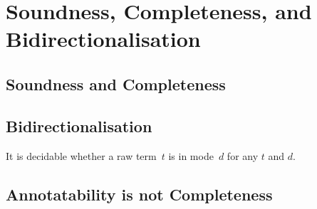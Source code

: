 
\section{Soundness, Completeness, and Bidirectionalisation} \label{sec:annotatability}

\subsection{Soundness and Completeness}
\begin{theorem}[Soundness]\label{thm:term-soundness}
    
\end{theorem}

\begin{theorem}[Completeness]\label{thm:term-completeness}
    
\end{theorem}

\subsection{Bidirectionalisation}


\begin{proposition} \label{thm:bidirectionalisation}
  It is decidable whether a raw term~$t$ is in mode~$d$ for any $t$ and $d$.
\end{proposition}

\subsection{Annotatability is not Completeness}

